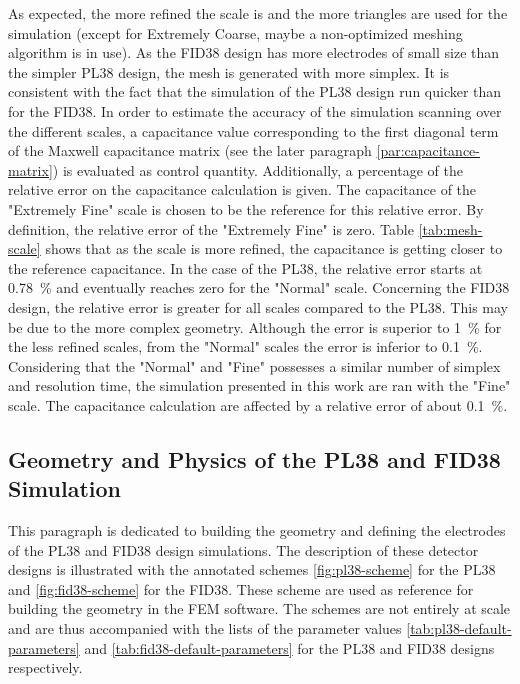 As expected, the more refined the scale is and the more triangles are used for the simulation (except for Extremely Coarse, maybe a non-optimized meshing algorithm is in use). As the FID38 design has more electrodes of small size than the simpler PL38 design, the mesh is generated with more simplex. It is consistent with the fact that the simulation of the PL38 design run quicker than for the FID38.
In order to estimate the accuracy of the simulation scanning over the different scales, a capacitance value corresponding to the first diagonal term of the Maxwell capacitance matrix (see the later paragraph \ref{par:capacitance-matrix}) is evaluated as control quantity. Additionally, a percentage of the relative error on the capacitance calculation is given. The capacitance of the "Extremely Fine" scale is chosen to be the reference for this relative error. By definition, the relative error of the "Extremely Fine" is zero. Table \ref{tab:mesh-scale} shows that as the scale is more refined, the capacitance is getting closer to the reference capacitance.
In the case of the PL38, the relative error starts at \SI{0.78}{\percent} and eventually reaches zero for the "Normal" scale. Concerning the FID38 design, the relative error is greater for all scales compared to the PL38. This may be due to the more complex geometry. Although the error is superior to \SI{1}{\percent} for the less refined scales, from the "Normal" scales the error is inferior to \SI{0.1}{\percent}.
Considering that the "Normal" and "Fine" possesses a similar number of simplex and resolution time, the simulation presented in this work are ran with the "Fine" scale. The capacitance calculation are affected by a relative error of about \SI{0.1}{\percent}. 


\subsection{Geometry and Physics of the PL38 and FID38 Simulation}

This paragraph is dedicated to building the geometry and defining the electrodes of the PL38 and FID38 design simulations. The description of these detector designs is illustrated with the annotated schemes \ref{fig:pl38-scheme} for the PL38 and \ref{fig:fid38-scheme} for the FID38. These scheme are used as reference for building the geometry in the FEM software. The schemes are not entirely at scale and are thus accompanied with the lists of the parameter values \ref{tab:pl38-default-parameters} and \ref{tab:fid38-default-parameters} for the PL38 and FID38 designs respectively.

